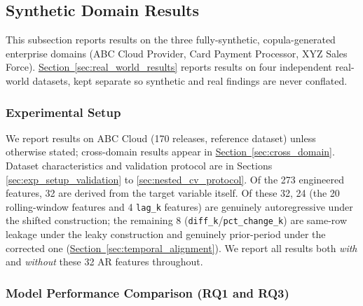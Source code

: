 \documentclass[technologies,article,submit,pdftex,moreauthors]{Definitions/mdpi}
\begin{document}
\subsection{Synthetic Domain Results}\label{sec:synthetic_results}

This subsection reports results on the three fully-synthetic, copula-generated enterprise domains (ABC Cloud Provider, Card Payment Processor, XYZ Sales Force). \hyperref[sec:real_world_results]{Section~\ref*{sec:real_world_results}} reports results on four independent real-world datasets, kept separate so synthetic and real findings are never conflated.

\subsubsection{Experimental Setup}\label{sec:results_setup}

We report results on ABC Cloud (170 releases, reference dataset) unless otherwise stated; cross-domain results appear in \hyperref[sec:cross_domain]{Section~\ref*{sec:cross_domain}}. Dataset characteristics and validation protocol are in Sections \hyperref[sec:exp_setup_validation]{\ref*{sec:exp_setup_validation}} to \hyperref[sec:nested_cv_protocol]{\ref*{sec:nested_cv_protocol}}. Of the 273 engineered features, 32 are derived from the target variable itself. Of these 32, 24 (the 20 rolling-window features and 4 \texttt{lag\_k} features) are genuinely autoregressive under the shifted construction; the remaining 8 (\texttt{diff\_k}/\texttt{pct\_change\_k}) are same-row leakage under the leaky construction and genuinely prior-period under the corrected one (\hyperref[sec:temporal_alignment]{Section~\ref*{sec:temporal_alignment}}). We report all results both \emph{with} and \emph{without} these 32 AR features throughout.

\subsubsection{Model Performance Comparison (RQ1 and RQ3)}\label{sec:model_perf}
\end{document}
